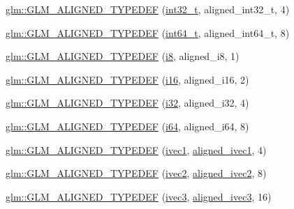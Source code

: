 \begin{DoxyCompactItemize}
\item 
\hyperlink{group__gtx__type__aligned_gae553b33349d6da832cf0724f1e024094}{glm\+::\+G\+L\+M\+\_\+\+A\+L\+I\+G\+N\+E\+D\+\_\+\+T\+Y\+P\+E\+D\+EF} (\hyperlink{group__gtc__type__precision_gab870c0eb6f525b0c8c4716762e0fc3a8}{int32\+\_\+t}, aligned\+\_\+int32\+\_\+t, 4)
\item 
\hyperlink{group__gtx__type__aligned_ga16d223a2b3409e812e1d3bd87f0e9e5c}{glm\+::\+G\+L\+M\+\_\+\+A\+L\+I\+G\+N\+E\+D\+\_\+\+T\+Y\+P\+E\+D\+EF} (\hyperlink{group__gtc__type__precision_ga6abb23fbf4e39c50ec5341160b5da5ab}{int64\+\_\+t}, aligned\+\_\+int64\+\_\+t, 8)
\item 
\hyperlink{group__gtx__type__aligned_ga2de065d2ddfdb366bcd0febca79ae2ad}{glm\+::\+G\+L\+M\+\_\+\+A\+L\+I\+G\+N\+E\+D\+\_\+\+T\+Y\+P\+E\+D\+EF} (\hyperlink{group__gtc__type__precision_gaae064be68b7d36cd7910c16e8ad18bba}{i8}, aligned\+\_\+i8, 1)
\item 
\hyperlink{group__gtx__type__aligned_gabd786bdc20a11c8cb05c92c8212e28d3}{glm\+::\+G\+L\+M\+\_\+\+A\+L\+I\+G\+N\+E\+D\+\_\+\+T\+Y\+P\+E\+D\+EF} (\hyperlink{group__gtc__type__precision_ga35e5542ca05b29cc256fdafb8503d1fd}{i16}, aligned\+\_\+i16, 2)
\item 
\hyperlink{group__gtx__type__aligned_gad4aefe56691cdb640c72f0d46d3fb532}{glm\+::\+G\+L\+M\+\_\+\+A\+L\+I\+G\+N\+E\+D\+\_\+\+T\+Y\+P\+E\+D\+EF} (\hyperlink{group__gtc__type__precision_ga1d8ed5c43e91ea7d4528389da4fa9524}{i32}, aligned\+\_\+i32, 4)
\item 
\hyperlink{group__gtx__type__aligned_ga8fe9745f7de24a8394518152ff9fccdc}{glm\+::\+G\+L\+M\+\_\+\+A\+L\+I\+G\+N\+E\+D\+\_\+\+T\+Y\+P\+E\+D\+EF} (\hyperlink{group__gtc__type__precision_gac7a7eaad46064fc952b06df33689da23}{i64}, aligned\+\_\+i64, 8)
\item 
\hyperlink{group__gtx__type__aligned_gaaad735483450099f7f882d4e3a3569bd}{glm\+::\+G\+L\+M\+\_\+\+A\+L\+I\+G\+N\+E\+D\+\_\+\+T\+Y\+P\+E\+D\+EF} (\hyperlink{gtc_2vec1_8hpp_a946031cea0c22745848ebd873e6facb0}{ivec1}, \hyperlink{group__gtc__type__aligned_gafe9657c41fa58e912f99e92284d79fce}{aligned\+\_\+ivec1}, 4)
\item 
\hyperlink{group__gtx__type__aligned_gac7b6f823802edbd6edbaf70ea25bf068}{glm\+::\+G\+L\+M\+\_\+\+A\+L\+I\+G\+N\+E\+D\+\_\+\+T\+Y\+P\+E\+D\+EF} (\hyperlink{group__core__types_ga9e6ce9cfc7919976b318197e18d8a065}{ivec2}, \hyperlink{group__gtc__type__aligned_ga2a709e1d21f3aae3f8d6de910f5fdff4}{aligned\+\_\+ivec2}, 8)
\item 
\hyperlink{group__gtx__type__aligned_ga3e235bcd2b8029613f25b8d40a2d3ef7}{glm\+::\+G\+L\+M\+\_\+\+A\+L\+I\+G\+N\+E\+D\+\_\+\+T\+Y\+P\+E\+D\+EF} (\hyperlink{group__core__types_ga6e12a4ca00d696f07da1df4eb73e0fe8}{ivec3}, \hyperlink{group__gtc__type__aligned_gabbf85e492d39baef3a418c15c996ab65}{aligned\+\_\+ivec3}, 16)

\end{DoxyCompactItemize}
